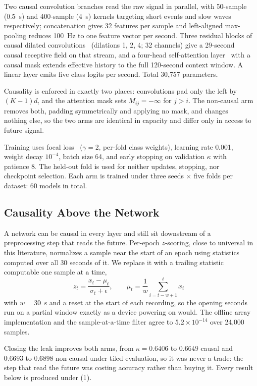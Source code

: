 \documentclass[conference]{IEEEtran}
\begin{document}
Two causal convolution branches read the raw signal in parallel, with 50-sample (0.5~s) and
400-sample (4~s) kernels targeting short events and slow waves respectively; concatenation gives 32
features per sample and left-aligned max-pooling reduces 100~Hz to one feature vector per second.
Three residual blocks of causal dilated convolutions~\cite{tcn} (dilations 1, 2, 4; 32 channels)
give a 29-second causal receptive field on that stream, and a four-head self-attention
layer~\cite{attention} with a causal mask extends effective history to the full 120-second context
window. A linear layer emits five class logits per second. Total 30{,}757 parameters.

Causality is enforced in exactly two places: convolutions pad only the left by $(K-1)d$, and the
attention mask sets $M_{ij} = -\infty$ for $j > i$. The non-causal arm removes both, padding
symmetrically and applying no mask, and changes nothing else, so the two arms are identical in
capacity and differ only in access to future signal.

Training uses focal loss~\cite{focal} ($\gamma = 2$, per-fold class weights), learning rate 0.001,
weight decay $10^{-4}$, batch size 64, and early stopping on validation $\kappa$ with patience 8.
The held-out fold is used for neither updates, stopping, nor checkpoint selection. Each arm is
trained under three seeds $\times$ five folds per dataset: 60 models in total.

\subsection{Causality Above the Network}

A network can be causal in every layer and still sit downstream of a preprocessing step that reads
the future. Per-epoch $z$-scoring, close to universal in this literature, normalizes a sample near
the start of an epoch using statistics computed over all 30 seconds of it. We replace it with a
trailing statistic computable one sample at a time,
\begin{equation}
z_t = \frac{x_t - \mu_t}{\sigma_t + \epsilon}, \qquad
\mu_t = \frac{1}{w}\sum_{i=t-w+1}^{t} x_i
\end{equation}
with $w = 30$~s and a reset at the start of each recording, so the opening seconds run on a partial
window exactly as a device powering on would. The offline array implementation and the
sample-at-a-time filter agree to $5.2\times10^{-14}$ over 24{,}000 samples.

Closing the leak improves both arms, from $\kappa = 0.6406$ to $0.6649$ causal and $0.6693$ to
$0.6898$ non-causal under tiled evaluation, so it was never a trade: the step that read the future
was costing accuracy rather than buying it. Every result below is produced under (1).
\end{document}
